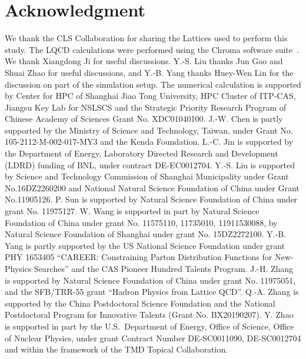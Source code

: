 \section*{Acknowledgment}
We thank the CLS Collaboration for sharing the Lattices used to perform this study. The LQCD calculations were performed using the Chroma software suite~\cite{Edwards:2004sx}.  We thank Xiangdong Ji for useful discussions.  Y.-S. Liu thanks Jun Gao and Shuai Zhao for useful discussions, and Y.-B. Yang thanks Huey-Wen Lin for the discussion on part of the simulation setup.
The numerical calculation is supported by Center for HPC of Shanghai Jiao Tong University, HPC Cluster of ITP-CAS, Jiangsu Key Lab for NSLSCS and the Strategic Priority Research Program of Chinese Academy of Sciences Grant No. XDC01040100.
J.-W. Chen is partly supported by the Ministry of Science and Technology, Taiwan, under Grant No. 105-2112-M-002-017-MY3 and the Kenda Foundation. L.-C. Jin is supported by the Department of Energy, Laboratory Directed Research and Development (LDRD) funding of BNL, under contract DE-EC0012704. Y.-S. Liu is supported by Science and Technology Commission of Shanghai Municipality under Grant No.16DZ2260200 and National Natural Science Foundation of China under Grant No.11905126.
P. Sun is supported by Natural Science Foundation of China under
grant No. 11975127.
W. Wang is supported in part by Natural Science Foundation of China under
grant No. 11575110, 11735010, 11911530088,  by Natural Science Foundation of Shanghai under grant No. 15DZ2272100.
Y.-B. Yang is  partly supported by the US National Science Foundation under grant PHY 1653405 ``CAREER: Constraining Parton Distribution Functions for New-Physics Searches'' and the CAS Pioneer Hundred Talents Program. J.-H. Zhang is supported by Natural Science Foundation of China under
grant No.  11975051, and  the SFB/TRR-55 grant ``Hadron Physics from Lattice QCD''. Q.-A. Zhang is supported by the China Postdoctoral Science Foundation and the National Postdoctoral Program for Innovative Talents (Grant No. BX20190207). Y. Zhao is supported in part by the U.S.~Department of Energy, Office of Science, Office of Nuclear Physics, under grant Contract Number DE-SC0011090, DE-SC0012704 and within the framework of the TMD Topical Collaboration.


\appendix


